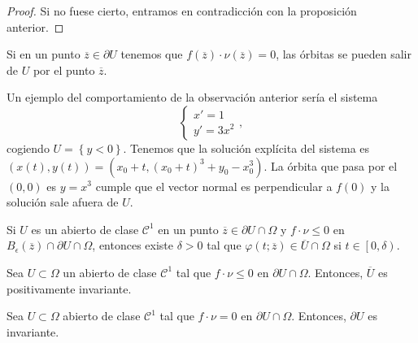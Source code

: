 \begin{proof}
Si no fuese cierto, entramos en contradicción con la proposición anterior.
\end{proof}
\begin{observation}
Si en un punto $\displaystyle \overline{z}\in \partial U $ tenemos que $\displaystyle f\left(\overline{z}\right) \cdot \nu\left(\overline{z}\right)= 0 $, las órbitas se pueden salir de $\displaystyle U $ por el punto $\displaystyle \overline{z} $. 
\end{observation}
\begin{eg}
Un ejemplo del comportamiento de la observación anterior sería el sistema
\[
\begin{cases}
x' = 1 \\
y' = 3x^{2}
\end{cases}
,\]
cogiendo $\displaystyle U = \left\{ y < 0\right\}  $. Tenemos que la solución explícita del sistema es $\displaystyle \left(x\left(t\right), y\left(t\right)\right)=\left(x_{0} + t, \left(x_{0} + t\right)^{3}+y_{0}-x_{0}^{3}\right) $. La órbita que pasa por el $\displaystyle \left(0,0\right) $ es $\displaystyle y = x^{3} $ cumple que el vector normal es perpendicular a $\displaystyle f\left(0\right) $ y la solución sale afuera de $\displaystyle U $. 
\end{eg}
\begin{prop}
	Si $\displaystyle U $ es un abierto de clase $\displaystyle \mathcal{C}^{1} $ en un punto $\displaystyle \overline{z}\in \partial U \cap \Omega  $ y $\displaystyle f \cdot \nu\leq 0 $ en $\displaystyle B_{\epsilon }\left(\overline{z}\right)\cap \partial U \cap \Omega  $, entonces existe $\displaystyle \delta > 0 $ tal que $\displaystyle \varphi\left(t; \overline{z}\right)\in \overline{U}\cap \Omega  $ si $\displaystyle t \in \left[0, \delta \right)  $. 
\end{prop}
\begin{colorary}
Sea $\displaystyle U\subset \Omega  $ un abierto de clase $\displaystyle \mathcal{C}^{1} $ tal que $\displaystyle f \cdot \nu \leq 0 $ en $\displaystyle \partial U \cap \Omega  $. Entonces, $\displaystyle \overline{U} $ es positivamente invariante. 
\end{colorary}
\begin{colorary}
Sea $\displaystyle U \subset \Omega  $ abierto de clase $\displaystyle \mathcal{C}^{1} $ tal que $\displaystyle f \cdot \nu = 0 $ en $\displaystyle \partial U \cap \Omega  $. Entonces, $\displaystyle \partial U $ es invariante. 
\end{colorary}
